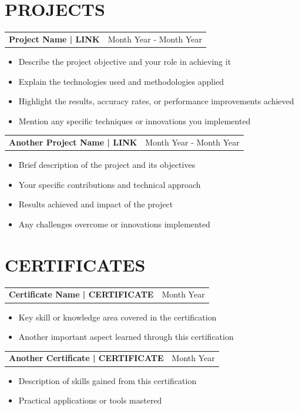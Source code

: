 \documentclass[11pt,a4paper]{article}
\newcommand{\project}[3]{
    \begin{tabularx}{\textwidth}{X r}
        \textbf{#1} & #3 \\
    \end{tabularx}
    \vspace{0.05in}
    #2
    \vspace{0.1in}
}
\newcommand{\certificate}[3]{
    \begin{tabularx}{\textwidth}{X r}
        \textbf{#1} & #3 \\
    \end{tabularx}
    \vspace{0.05in}
    #2
    \vspace{0.1in}
}
\begin{document}
\section*{PROJECTS}

\project{Project Name | LINK}{
\begin{itemize}[leftmargin=*,noitemsep,topsep=0pt]
    \item Describe the project objective and your role in achieving it
    \item Explain the technologies used and methodologies applied
    \item Highlight the results, accuracy rates, or performance improvements achieved
    \item Mention any specific techniques or innovations you implemented
\end{itemize}
}{Month Year - Month Year}

\project{Another Project Name | LINK}{
\begin{itemize}[leftmargin=*,noitemsep,topsep=0pt]
    \item Brief description of the project and its objectives
    \item Your specific contributions and technical approach
    \item Results achieved and impact of the project
    \item Any challenges overcome or innovations implemented
\end{itemize}
}{Month Year - Month Year}

\section*{CERTIFICATES}

\certificate{Certificate Name | CERTIFICATE}{
\begin{itemize}[leftmargin=*,noitemsep,topsep=0pt]
    \item Key skill or knowledge area covered in the certification
    \item Another important aspect learned through this certification
\end{itemize}
}{Month Year}

\certificate{Another Certificate | CERTIFICATE}{
\begin{itemize}[leftmargin=*,noitemsep,topsep=0pt]
    \item Description of skills gained from this certification
    \item Practical applications or tools mastered
\end{itemize}
}{Month Year}
\end{document}

